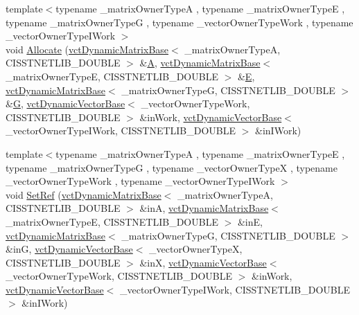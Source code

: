 \begin{DoxyCompactItemize}
{\footnotesize template$<$typename \+\_\+matrix\+Owner\+Type\+A , typename \+\_\+matrix\+Owner\+Type\+E , typename \+\_\+matrix\+Owner\+Type\+G , typename \+\_\+vector\+Owner\+Type\+Work , typename \+\_\+vector\+Owner\+Type\+I\+Work $>$ }\\void \hyperlink{classnmr_l_sq_lin_solution_dynamic_a32ea606d33b601d46cb99c53c55c3f27}{Allocate} (\hyperlink{classvct_dynamic_matrix_base}{vct\+Dynamic\+Matrix\+Base}$<$ \+\_\+matrix\+Owner\+Type\+A, C\+I\+S\+S\+T\+N\+E\+T\+L\+I\+B\+\_\+\+D\+O\+U\+B\+L\+E $>$ \&\hyperlink{classnmr_l_sq_lin_solution_dynamic_aa4a41abac141e2e55dd5cafb59169dfd}{A}, \hyperlink{classvct_dynamic_matrix_base}{vct\+Dynamic\+Matrix\+Base}$<$ \+\_\+matrix\+Owner\+Type\+E, C\+I\+S\+S\+T\+N\+E\+T\+L\+I\+B\+\_\+\+D\+O\+U\+B\+L\+E $>$ \&\hyperlink{classnmr_l_sq_lin_solution_dynamic_a7c1ac112b07f3edd33d348fe0a40fb71}{E}, \hyperlink{classvct_dynamic_matrix_base}{vct\+Dynamic\+Matrix\+Base}$<$ \+\_\+matrix\+Owner\+Type\+G, C\+I\+S\+S\+T\+N\+E\+T\+L\+I\+B\+\_\+\+D\+O\+U\+B\+L\+E $>$ \&\hyperlink{classnmr_l_sq_lin_solution_dynamic_a399cb314fb848d36f58c14830bad0c28}{G}, \hyperlink{classvct_dynamic_vector_base}{vct\+Dynamic\+Vector\+Base}$<$ \+\_\+vector\+Owner\+Type\+Work, C\+I\+S\+S\+T\+N\+E\+T\+L\+I\+B\+\_\+\+D\+O\+U\+B\+L\+E $>$ \&in\+Work, \hyperlink{classvct_dynamic_vector_base}{vct\+Dynamic\+Vector\+Base}$<$ \+\_\+vector\+Owner\+Type\+I\+Work, C\+I\+S\+S\+T\+N\+E\+T\+L\+I\+B\+\_\+\+D\+O\+U\+B\+L\+E $>$ \&in\+I\+Work)
\item 
{\footnotesize template$<$typename \+\_\+matrix\+Owner\+Type\+A , typename \+\_\+matrix\+Owner\+Type\+E , typename \+\_\+matrix\+Owner\+Type\+G , typename \+\_\+vector\+Owner\+Type\+X , typename \+\_\+vector\+Owner\+Type\+Work , typename \+\_\+vector\+Owner\+Type\+I\+Work $>$ }\\void \hyperlink{classnmr_l_sq_lin_solution_dynamic_ab01c1ed5c95daa2535419fb7731017ee}{Set\+Ref} (\hyperlink{classvct_dynamic_matrix_base}{vct\+Dynamic\+Matrix\+Base}$<$ \+\_\+matrix\+Owner\+Type\+A, C\+I\+S\+S\+T\+N\+E\+T\+L\+I\+B\+\_\+\+D\+O\+U\+B\+L\+E $>$ \&in\+A, \hyperlink{classvct_dynamic_matrix_base}{vct\+Dynamic\+Matrix\+Base}$<$ \+\_\+matrix\+Owner\+Type\+E, C\+I\+S\+S\+T\+N\+E\+T\+L\+I\+B\+\_\+\+D\+O\+U\+B\+L\+E $>$ \&in\+E, \hyperlink{classvct_dynamic_matrix_base}{vct\+Dynamic\+Matrix\+Base}$<$ \+\_\+matrix\+Owner\+Type\+G, C\+I\+S\+S\+T\+N\+E\+T\+L\+I\+B\+\_\+\+D\+O\+U\+B\+L\+E $>$ \&in\+G, \hyperlink{classvct_dynamic_vector_base}{vct\+Dynamic\+Vector\+Base}$<$ \+\_\+vector\+Owner\+Type\+X, C\+I\+S\+S\+T\+N\+E\+T\+L\+I\+B\+\_\+\+D\+O\+U\+B\+L\+E $>$ \&in\+X, \hyperlink{classvct_dynamic_vector_base}{vct\+Dynamic\+Vector\+Base}$<$ \+\_\+vector\+Owner\+Type\+Work, C\+I\+S\+S\+T\+N\+E\+T\+L\+I\+B\+\_\+\+D\+O\+U\+B\+L\+E $>$ \&in\+Work, \hyperlink{classvct_dynamic_vector_base}{vct\+Dynamic\+Vector\+Base}$<$ \+\_\+vector\+Owner\+Type\+I\+Work, C\+I\+S\+S\+T\+N\+E\+T\+L\+I\+B\+\_\+\+D\+O\+U\+B\+L\+E $>$ \&in\+I\+Work)

\end{DoxyCompactItemize}
